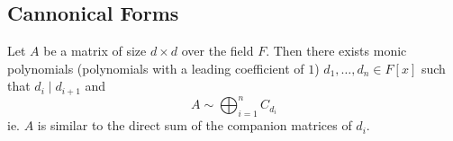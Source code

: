 \documentclass[10pt]{article}
\def\divides{{\mid}}
\begin{document}


\bigskip

\subsection{Cannonical Forms}

\begin{thrm*}

    Let $A$ be a matrix of size $d\times d$ over the field $F$.
    Then there exists monic polynomials (polynomials with a leading coefficient of $1$) $d_1,\dots,d_n\in F[x]$ such that $d_i\divides d_{i+1}$ and
    \[ A\sim\bigoplus_{i=1}^n C_{d_i} \]
    ie. $A$ is similar to the direct sum of the companion matrices of $d_i$.

\end{thrm*}
\end{document}
